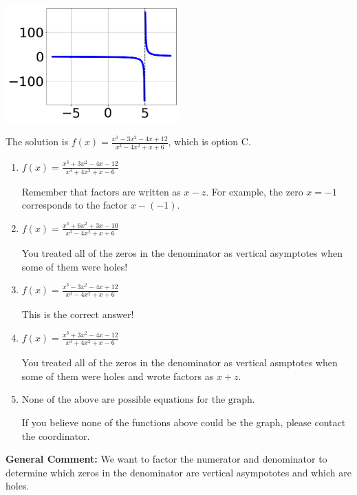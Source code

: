 \documentclass{extbook}[14pt]
\begin{document}
\begin{enumerate}
{\begin{center}
    \includegraphics[width=0.5\textwidth]{../Figures/identifyGraphOfRationalFunctionC.png}
\end{center}


The solution is \( f(x)=\frac{x^{3} -3 x^{2} -4 x + 12}{x^{3} -4 x^{2} +x + 6} \), which is option C.\begin{enumerate}[label=\Alph*.]
\item \( f(x)=\frac{x^{3} +3 x^{2} -4 x -12}{x^{3} +4 x^{2} +x -6} \)

Remember that factors are written as $x-z$. For example, the zero $x=-1$ corresponds to the factor $x-(-1)$.
\item \( f(x)=\frac{x^{3} +6 x^{2} +3 x -10}{x^{3} -4 x^{2} +x + 6} \)

You treated all of the zeros in the denominator as vertical asymptotes when some of them were holes!
\item \( f(x)=\frac{x^{3} -3 x^{2} -4 x + 12}{x^{3} -4 x^{2} +x + 6} \)

This is the correct answer!
\item \( f(x)=\frac{x^{3} +3 x^{2} -4 x -12}{x^{3} +4 x^{2} +x -6} \)

You treated all of the zeros in the denominator as vertical asmptotes when some of them were holes and wrote factors as $x+z$.
\item \( \text{None of the above are possible equations for the graph.} \)

If you believe none of the functions above could be the graph, please contact the coordinator.
\end{enumerate}

\textbf{General Comment:} We want to factor the numerator and denominator to determine which zeros in the denominator are vertical asympototes and which are holes.
}
\end{enumerate}
\end{document}
